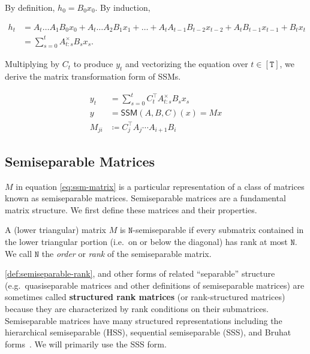 By definition, $h_0 = B_0 x_0$. By induction,

\begin{align*}
  h_t &= A_t \dots A_1 B_0 x_0 + A_t \dots A_2 B_1 x_1 + \dots + A_t A_{t-1} B_{t-2} x_{t-2} + A_t B_{t-1} x_{t-1} + B_t x_t
    \\&= \sum_{s=0}^t A_{t:s}^\times B_s x_s .
\end{align*}

Multiplying by $C_t$ to produce $y_t$ and vectorizing the equation over $t \in [\mathtt{T}]$,
we derive the matrix transformation form of SSMs.

\begin{equation}
  \label{eq:ssm-matrix}
  \begin{aligned}
    y_t &= \sum_{s=0}^t C_t^{\top} A_{t:s}^\times B_s x_s
    \\
    y &= \mathsf{SSM}(A, B, C)(x) = Mx
    \\
    M_{ji} &\coloneqq C_j^{\top} A_{j} \cdots A_{i+1} B_{i}
  \end{aligned}
\end{equation}

\subsection{Semiseparable Matrices}

$M$ in equation \eqref{eq:ssm-matrix} is a particular representation of a class of matrices known as semiseparable matrices. Semiseparable matrices are a fundamental matrix structure. We first define these matrices and their properties.

\begin{definition}
  \label{def:semiseparable-rank}
  A (lower triangular) matrix $M$ is $\mathtt{N}$-semiseparable if every submatrix contained in the lower triangular portion (i.e.\ on or below the diagonal) has rank at most $\mathtt{N}$.
  We call $\mathtt{N}$ the \emph{order} or \emph{rank} of the semiseparable matrix.
\end{definition}

\ref{def:semiseparable-rank}, and other forms of related ``separable'' structure (e.g.\ quasiseparable matrices and other definitions of semiseparable matrices) are sometimes called \textbf{structured rank matrices} (or rank-structured matrices) because they are characterized by rank conditions on their submatrices. Semiseparable matrices have many structured representations including the hierarchical semiseparable (HSS), sequential semiseparable (SSS), and Bruhat forms~\citep{pernet2018time}.
We will primarily use the SSS form.

